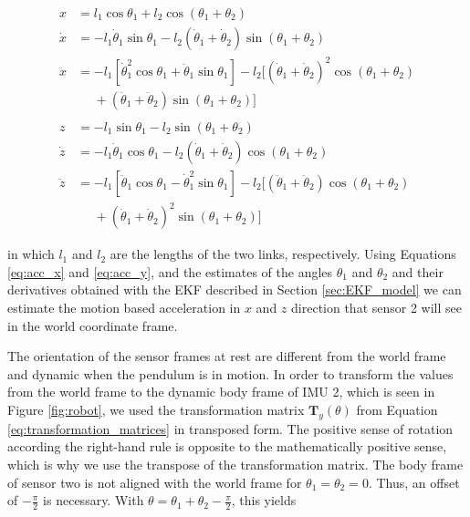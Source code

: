 \begin{align}
  x &=l_1 \cos \theta_1 + l_2 \cos(\theta_1 + \theta_2) \\
  \dot{x} &= -l_1 \dot{\theta}_1 \sin \theta_1  - l_2 (\dot{\theta}_1 + \dot{\theta}_2) \sin(\theta_1 + \theta_2) \\
  \ddot{x} {}&= -l_1 [\dot{\theta}^2_1 \cos \theta_1 + \ddot{\theta}_1 \sin \theta_1] - l_2 [(\dot{\theta}_1 + \dot{\theta}_2)^2 \cos(\theta_1 + \theta_2) \nonumber \\ 
  &\mathrel{\phantom{=}} + (\ddot{\theta}_1 + \ddot{\theta}_2) \sin(\theta_1 + \theta_2)] \label{eq:acc_x} \\
  \nonumber \\
  z &= -l_1 \sin \theta_1 - l_2 \sin(\theta_1 + \theta_2) \\
  \dot{z} &= -l_1 \dot{\theta}_1 \cos \theta_1  - l_2 (\dot{\theta}_1 + \dot{\theta}_2) \cos(\theta_1 + \theta_2) \\
  \ddot{z} {}&= -l_1 [\ddot{\theta}_1 \cos \theta_1 - \dot{\theta}^2_1 \sin \theta_1] - l_2 [(\ddot{\theta}_1 + \ddot{\theta}_2) \cos(\theta_1 + \theta_2) \nonumber \\ 
  &\mathrel{\phantom{=}} + (\dot{\theta}_1 + \dot{\theta}_2)^2 \sin(\theta_1 + \theta_2)] \label{eq:acc_y}
\end{align}

\noindent
in which $l_1$ and $l_2$ are the lengths of the two links, respectively. Using Equations \ref{eq:acc_x} and \ref{eq:acc_y}, and the estimates of the angles $\theta_1$ and $\theta_2$ and their derivatives obtained with the EKF described in Section \ref{sec:EKF_model} we can estimate the motion based acceleration in $x$ and $z$ direction that sensor 2 will see in the world coordinate frame.

The orientation of the sensor frames at rest are different from the world frame and dynamic when the pendulum is in motion. In order to transform the values from the world frame to the dynamic body frame of \gls{IMU} 2, which is seen in Figure \ref{fig:robot}, we used the transformation matrix $\mathbf{T}_y(\theta)$ from Equation \ref{eq:transformation_matrices} in transposed form. The positive sense of rotation according the right-hand rule is opposite to the mathematically positive sense, which is why we use the transpose of the transformation matrix. The body frame of sensor two is not aligned with the world frame for $\theta_1 = \theta_2 = 0$. Thus, an offset of $-\frac{\pi}{2}$ is necessary. With $\theta = \theta_1 + \theta_2 - \frac{\pi}{2}$, this yields

